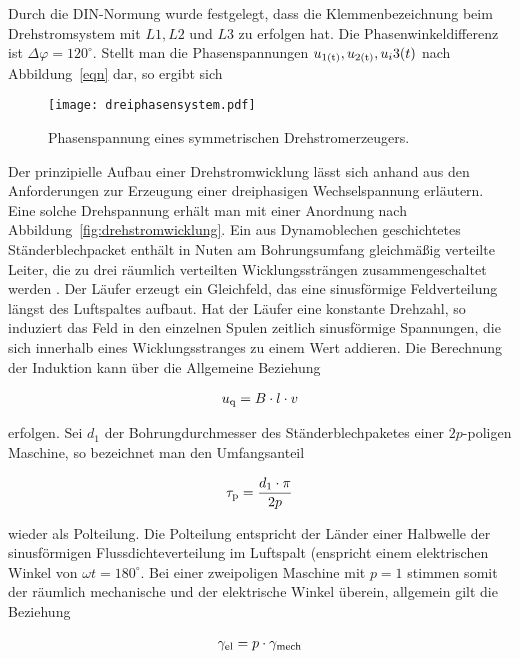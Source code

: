 Durch die DIN-Normung wurde festgelegt, dass die Klemmenbezeichnung beim Drehstromsystem mit $L1, L2$ und $L3$ zu erfolgen hat.
Die Phasenwinkeldifferenz ist $\Delta \varphi = 120^{\circ}$.
Stellt man die Phasenspannungen $u_{\mathrm{1(t)}}, u_{\mathrm{2(t)}}, u_i{3(t)}$ nach Abbildung~\ref{eqn} dar, so ergibt sich 

\begin{figure}[!h]
\centering
\texttt{[image: dreiphasensystem.pdf]}
\label{fig:dreiphasen}
\caption{Phasenspannung eines symmetrischen Drehstromerzeugers.}
\end{figure}

Der prinzipielle Aufbau einer Drehstromwicklung lässt sich anhand aus den Anforderungen zur Erzeugung einer dreiphasigen Wechselspannung erläutern.
Eine solche Drehspannung erhält man mit einer Anordnung nach Abbildung~\ref{fig:drehstromwicklung}.
Ein aus Dynamoblechen geschichtetes Ständerblechpacket enthält in Nuten am Bohrungsumfang gleichmäßig verteilte Leiter, die zu drei räumlich verteilten Wicklungssträngen zusammengeschaltet werden \autocite[S.~141]{fischer2009}.
Der Läufer erzeugt ein Gleichfeld, das eine sinusförmige Feldverteilung längst des Luftspaltes aufbaut.
Hat der Läufer eine konstante Drehzahl, so induziert das Feld in den einzelnen Spulen zeitlich sinusförmige Spannungen, die sich innerhalb eines Wicklungsstranges zu einem Wert addieren.
Die Berechnung der Induktion kann über die Allgemeine Beziehung

\begin{align}
u_{\mathrm{q}} = B\cdot l \cdot v
\end{align}

erfolgen.
Sei $d_1$ der Bohrungdurchmesser des Ständerblechpaketes einer $2p$-poligen Maschine, so bezeichnet man den Umfangsanteil

\begin{align}
\tau_{\mathrm{p}} = \frac{d_{\mathrm{1}} \cdot \pi}{2p}
\end{align}

wieder als Polteilung.
Die Polteilung entspricht der Länder einer Halbwelle der sinusförmigen Flussdichteverteilung im Luftspalt (enspricht einem elektrischen Winkel von $\omega t = 180^{\circ}$.
Bei einer zweipoligen Maschine mit $p=1$ stimmen somit der räumlich mechanische und der elektrische Winkel überein, allgemein gilt die Beziehung \autocite[S.141f.]{fischer2009}

\begin{align}
\gamma_{\mathrm{el}} = p\cdot \gamma_{\mathrm{mech}}
\end{align}

